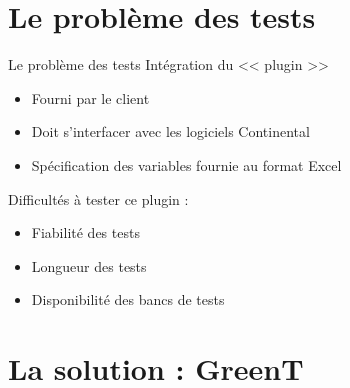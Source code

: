 \documentclass{beamer}
\begin{document}
\section{Le probl\`eme des tests}
\begin{frame}{Le problème des tests}
	Intégration du << plugin >>
	\vspace{-10px}
			\begin{itemize}
				\item Fourni par le client
				\item Doit s'interfacer avec les logiciels Continental 
				\item Spécification des variables fournie au format Excel
			\end{itemize}
			\vfill
			\pause
	Difficultés à tester ce plugin : 
	\vspace{-10px}
	\begin{itemize}
		\item Fiabilité des tests
		\item Longueur des tests
		\item Disponibilité des bancs de tests
	\end{itemize}
\end{frame}

\section{La solution : GreenT}
\end{document}
